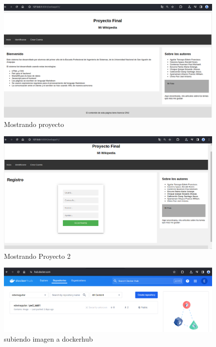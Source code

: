 \documentclass{article}
\begin{document}
\begin{itemize}
    \begin{figure}[H]
  \centering
  \includegraphics[width=1\textwidth]{img/Pictures/fakewiki.png}
  \caption{Mostrando proyecto}
  \end{figure}

    \begin{figure}[H]
  \centering
  \includegraphics[width=1\textwidth]{img/Pictures/fakewiki2.png}
  \caption{Mostrando Proyecto 2}
  \end{figure}
    \begin{figure}[H]
  \centering
  \includegraphics[width=1\textwidth]{img/Pictures/dockerHub.png}
  \caption{subiendo imagen a dockerhub}
  \end{figure}


\end{itemize}
\end{document}
